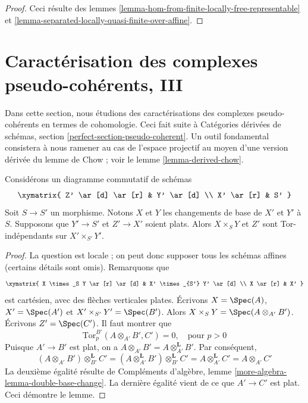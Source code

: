 \begin{proof}
Ceci résulte des
lemmes \ref{lemma-hom-from-finite-locally-free-representable} et
\ref{lemma-separated-locally-quasi-finite-over-affine}.
\end{proof}









\section{Caractérisation des complexes pseudo-cohérents, III}
\label{section-characterize-pseudo-coherent}

\noindent
Dans cette section, nous étudions des caractérisations des complexes pseudo-cohérents
en termes de cohomologie. Ceci fait suite à
Catégories dérivées de schémas, section
\ref{perfect-section-pseudo-coherent}.
Un outil fondamental consistera à nous ramener au cas de l'espace projectif
au moyen d'une version dérivée du lemme de Chow ; voir le lemme \ref{lemma-derived-chow}.

\begin{lemma}
\label{lemma-case-of-tor-independence}
Considérons un diagramme commutatif de schémas
$$
\xymatrix{
Z' \ar[d] \ar[r] & Y' \ar[d] \\
X' \ar[r] & S'
}
$$
Soit $S \to S'$ un morphisme. Notons $X$ et $Y$ les changements de
base de $X'$ et $Y'$ à $S$.
Supposons que $Y' \to S'$ et $Z' \to X'$ soient plats.
Alors $X \times_S Y$ et $Z'$ sont Tor-indépendants sur $X' \times_{S'} Y'$.
\end{lemma}

\begin{proof}
La question est locale ; on peut donc supposer tous les schémas affines
(certains détails sont omis). Remarquons que
$$
\xymatrix{
X \times_S Y \ar[r] \ar[d] & X' \times_{S'} Y' \ar[d] \\
X \ar[r] & X'
}
$$
est cartésien, avec des flèches verticales plates.
Écrivons $X = \Spec(A)$, $X' = \Spec(A')$ et
$X' \times_{S'} Y' = \Spec(B')$. Alors
$X \times_S Y = \Spec(A \otimes_{A'} B')$.
Écrivons $Z' = \Spec(C')$. Il faut montrer que
$$
\text{Tor}_p^{B'}(A \otimes_{A'} B', C') = 0,
\quad\text{pour } p > 0
$$
Puisque $A' \to B'$ est plat,
on a $A \otimes_{A'} B' = A \otimes_{A'}^\mathbf{L} B'$.
Par conséquent,
$$
(A \otimes_{A'} B') \otimes_{B'}^\mathbf{L} C' =
(A \otimes_{A'}^\mathbf{L} B') \otimes_{B'}^\mathbf{L} C' =
A \otimes_{A'}^\mathbf{L} C' =
A \otimes_{A'} C'
$$
La deuxième égalité résulte de Compléments d'algèbre, lemme
\ref{more-algebra-lemma-double-base-change}.
La dernière égalité vient de ce que $A' \to C'$ est plat. Ceci démontre le lemme.
\end{proof}


